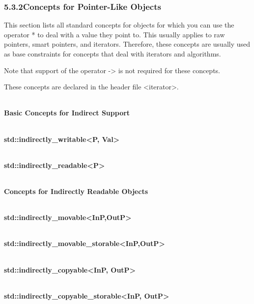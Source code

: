 \subsubsection*{ 5.3.2\hspace{0.2cm}Concepts for Pointer-Like Objects}

This section lists all standard concepts for objects for which you can use the operator * to deal with a value they point to. This usually applies to raw pointers, smart pointers, and iterators. Therefore, these concepts are usually used as base constraints for concepts that deal with iterators and algorithms.

Note that support of the operator -> is not required for these concepts.

These concepts are declared in the header file <iterator>.


\noindent
\hspace*{\fill} \\ %
\textbf{Basic Concepts for Indirect Support}


\noindent
\hspace*{\fill} \\ %
\textbf{std::indirectly\_writable<P, Val>}

\noindent
\hspace*{\fill} \\ %
\textbf{std::indirectly\_readable<P>}

\noindent
\hspace*{\fill} \\ %
\textbf{Concepts for Indirectly Readable Objects}

\noindent
\hspace*{\fill} \\ %
\textbf{std::indirectly\_movable<InP,OutP>}

\noindent
\hspace*{\fill} \\ %
\textbf{std::indirectly\_movable\_storable<InP,OutP>}

\noindent
\hspace*{\fill} \\ %
\textbf{std::indirectly\_copyable<InP, OutP>}

\noindent
\hspace*{\fill} \\ %
\textbf{std::indirectly\_copyable\_storable<InP, OutP>}

